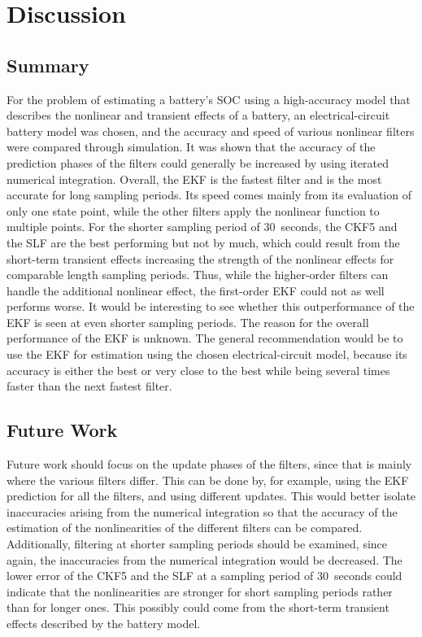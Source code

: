 \documentclass[../zhang_thesis.tex]{subfiles}
\begin{document}
\chapter{Discussion}


\section{Summary}

For the problem of estimating a battery's SOC using a high-accuracy model that describes the nonlinear and transient effects of a battery, an electrical-circuit battery model was chosen, and the accuracy and speed of various nonlinear filters were compared through simulation. It was shown that the accuracy of the prediction phases of the filters could generally be increased by using iterated numerical integration. Overall, the EKF is the fastest filter and is the most
accurate for long sampling periods. Its speed comes mainly from its evaluation of only one state point, while the other filters apply the nonlinear function to multiple points. For the shorter sampling period of 30~seconds, the CKF5 and the SLF are the best performing but not by much, which could result from the short-term transient effects increasing the strength of the nonlinear effects for comparable length sampling periods. Thus, while the higher-order filters can handle the
additional nonlinear effect, the first-order EKF could not as well performs worse. It would be interesting to see whether this outperformance of the EKF is seen at even shorter sampling periods. The reason for the overall performance of the EKF is unknown. The general recommendation would be to use the EKF for estimation using the chosen electrical-circuit model, because its accuracy is either the best or very close to the best while being several times faster than the next fastest
filter.

\section{Future Work}

Future work should focus on the update phases of the filters, since that is mainly where the various filters differ. This can be done by, for example, using the EKF prediction for all the filters, and using different updates. This would better isolate inaccuracies arising from the numerical integration so that the accuracy of the estimation of the nonlinearities of the different filters can be compared. Additionally, filtering at shorter sampling periods should be examined,
since again, the inaccuracies from the numerical integration would be decreased. The lower error of the CKF5 and the SLF at a sampling period of 30~seconds could indicate that the nonlinearities are stronger for short sampling periods rather than for longer ones. This possibly could come from the short-term transient effects described by the battery model.
\end{document}
